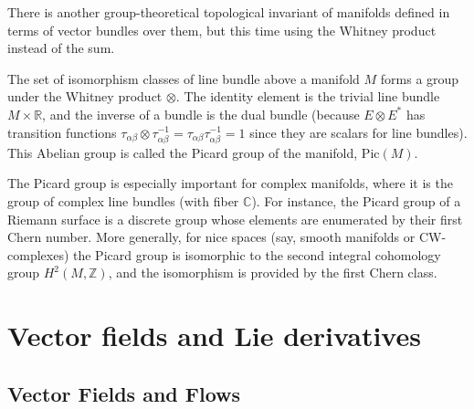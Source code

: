 \documentclass[english,letterpaper]{article}%
\numberwithin{equation}{section}
\numberwithin{figure}{section}
\numberwithin{table}{section}
\theoremstyle{definition}
\theoremstyle{definition}
\theoremstyle{definition}
\theoremstyle{plain}
\theoremstyle{plain}
\theoremstyle{plain}
\theoremstyle{plain}
\theoremstyle{remark}
\theoremstyle{remark}
\def\red{\color{red}}
\newcommand{\PRLsep}{   %
           \noindent\makebox[\linewidth]{
                \resizebox{0.5\linewidth}{1pt}{$\blacklozenge$}}}
\begin{document}
There is another group-theoretical topological invariant of manifolds defined in terms of vector bundles over them, but this time using the Whitney product instead of the sum.

\begin{defn}
The set of isomorphism classes of line bundle above a manifold $M$ forms a group under the Whitney product $\otimes$. The identity element is the trivial line bundle $M\times\mathbb{R}$, and the inverse of a bundle is the dual bundle (because $E\otimes E^\ast$ has transition functions $\tau_{\alpha\beta}\otimes \tau_{\alpha\beta}^{-1}=\tau_{\alpha\beta} \tau_{\alpha\beta}^{-1}=1$ since they are scalars for line bundles).
This Abelian group is called the Picard group of the manifold, $\mathrm{Pic}(M)$.
\end{defn}
\begin{rem}
The Picard group is especially important for complex manifolds, where it is the group of complex line bundles (with fiber $\mathbb{C}$). For instance, the Picard group of a Riemann surface is a discrete group whose elements are enumerated by their first Chern number. More generally, for nice spaces (say, smooth manifolds or CW-complexes) the Picard group is isomorphic to the second integral cohomology group $H^2(M,\mathbb{Z})$, and the isomorphism is provided by the first Chern class.
\end{rem}

\section{Vector fields and Lie derivatives}


\subsection{Vector Fields and Flows}
\end{document}
